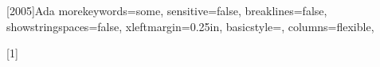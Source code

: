 
\newcommand{\newterm}[1]{\emph{#1}}    %
\newcommand{\code}[1]{\texttt{#1}}     %
\newcommand{\filename}[1]{\texttt{#1}} %
\newcommand{\SPARK}{\textsc{Spark}}    %


%
\let\underscore\_
\newcommand{\breakingunderscore}{\renewcommand{\_}{\underscore\hspace{0pt}}}

\breakingunderscore



\long{} 

\long{} 

\long{} 

\long{} 



[2005]{Ada}
{
  morekeywords={some},
  sensitive=false,
  breaklines=false,
  showstringspaces=false,
  xleftmargin=0.25in,
  basicstyle=\small\sffamily,
  columns=flexible,
}
\lstset{language=Ada2012, showlines=true}

%
[1]
   {\lstset{language=Ada2012,xleftmargin=#1}}
   {}
   
%
\newcommand{\wideinputlisting}[2]{%
   }


